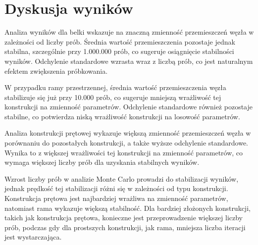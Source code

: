 \section{Dyskusja wyników}

Analiza wyników dla belki wskazuje na znaczną zmienność przemieszczeń węzła w zależności od liczby prób.
Średnia wartość przemieszczenia pozostaje jednak stabilna, szczególnie przy 1.000.000 prób, co sugeruje osiągnięcie stabilności wyników.
Odchylenie standardowe wzrasta wraz z liczbą prób, co jest naturalnym efektem zwiększenia próbkowania.

W przypadku ramy przestrzennej, średnia wartość przemieszczenia węzła stabilizuje się już przy 10.000 prób, co sugeruje mniejszą wrażliwość tej konstrukcji na zmienność parametrów.
Odchylenie standardowe również pozostaje stabilne, co potwierdza niską wrażliwość konstrukcji na losowość parametrów.

Analiza konstrukcji prętowej wykazuje większą zmienność przemieszczeń węzła w porównaniu do pozostałych konstrukcji, a także wyższe odchylenie standardowe.
Wynika to z większej wrażliwości tej konstrukcji na zmienność parametrów, co wymaga większej liczby prób dla uzyskania stabilnych wyników.

Wzrost liczby prób w analizie Monte Carlo prowadzi do stabilizacji wyników, jednak prędkość tej stabilizacji różni się w zależności od typu konstrukcji.
Konstrukcja prętowa jest najbardziej wrażliwa na zmienność parametrów, natomiast rama wykazuje większą stabilność.
Dla bardziej złożonych konstrukcji, takich jak konstrukcja prętowa, konieczne jest przeprowadzenie większej liczby prób, podczas gdy dla prostszych konstrukcji, jak rama, mniejsza liczba iteracji jest wystarczająca.
